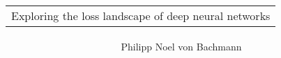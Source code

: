 \documentclass[
a4paper, 12pt, %
titlepage, 		 %
twoside,			 %
headsepline,	 %
BCOR5mm,			 %
idxtotoc, bibtotoc]{scrreprt}	%
\title{\begin{tabular}{p{11cm}}\centering\Large
Exploring the loss landscape of deep neural networks
\end{tabular}}
\author{\large Philipp Noel von Bachmann}
\date{} %
\begin{document}

\maketitle

\begin{abstract}
\end{abstract}

% 




\tableofcontents		%
\cleardoublepage		%








%




%

%




% 
\end{document}
